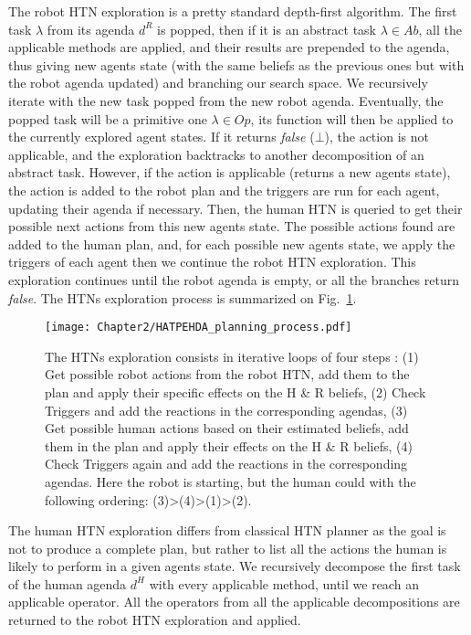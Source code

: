 The robot HTN exploration is a pretty standard depth-first algorithm. The first task $\lambda$ from its agenda $d^R$ is popped, then if it is an abstract task $\lambda \in Ab$, all the applicable methods are applied, and their results are prepended to the agenda, thus giving new agents state (with the same beliefs as the previous ones but with the robot agenda updated) and branching our search space. We recursively iterate with the new task popped from the new robot agenda. Eventually, the popped task will be a primitive one $\lambda \in Op$, its function will then be applied to the currently explored agent states. If it returns \textit{false} ($\bot$), the action is not applicable, and the exploration backtracks to another decomposition of an abstract task. However, if the action is applicable (returns a new agents state), the action is added to the robot plan and the triggers are run for each agent, updating their agenda if necessary. Then, the human HTN is queried to get their possible next actions from this new agents state. The possible actions found are added to the human plan, and, for each possible new agents state, we apply the triggers of each agent then we continue the robot HTN exploration. This exploration continues until the robot agenda is empty, or all the branches return \textit{false}. The HTNs exploration process is summarized on Fig.~\ref{fig:HATPEHDA_planning_process}.

\begin{figure}
    \centering
    \texttt{[image: Chapter2/HATPEHDA\_planning\_process.pdf]}
    \caption{The HTNs exploration consists in iterative loops of four steps : (1) Get possible robot actions from the robot HTN, add them to the plan and apply their specific effects on the H \& R beliefs, (2) Check Triggers and add the reactions in the corresponding agendas, (3) Get possible human actions based on their estimated beliefs, add them in the plan and apply their effects on the H \& R  beliefs, (4) Check Triggers again and add the reactions in the corresponding agendas. Here the robot is starting, but the human could with the following ordering: (3)>(4)>(1)>(2).}
    \label{fig:HATPEHDA_planning_process}
\end{figure}

The human HTN exploration differs from classical HTN planner as the goal is not to produce a complete plan, but rather to list all the actions the human is likely to perform in a given agents state. 
We recursively decompose the first task of the human agenda $d^H$ with every applicable method, until we reach an applicable operator. All the operators from all the applicable decompositions are returned to the robot HTN exploration and applied.

